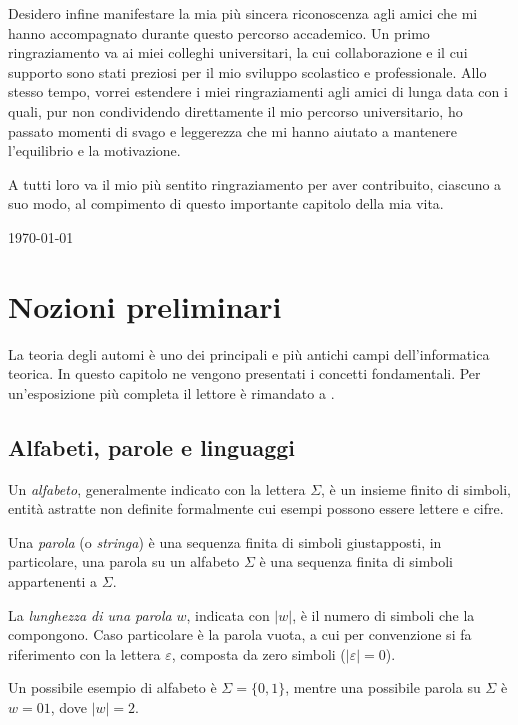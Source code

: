 \documentclass[a4paper,12pt]{report} %
\begin{document}
Desidero infine manifestare la mia più sincera riconoscenza agli amici che mi hanno accompagnato durante
questo percorso accademico. Un primo ringraziamento va ai miei colleghi universitari, la cui collaborazione
e il cui supporto sono stati preziosi per il mio sviluppo scolastico e professionale. 
Allo stesso tempo, vorrei estendere i miei ringraziamenti agli amici di lunga data con i quali,
pur non condividendo direttamente il mio percorso universitario, ho passato momenti di svago e leggerezza
che mi hanno aiutato a mantenere l'equilibrio e la motivazione.

A tutti loro va il mio più sentito ringraziamento per aver contribuito, ciascuno a suo modo, 
al compimento di questo importante capitolo della mia vita.

\hfill \today


\afterpreface


\chapter{Nozioni preliminari}
\label{cap1}

La teoria degli automi è uno dei principali e più antichi campi dell'informatica teorica. In questo capitolo
ne vengono presentati i concetti fondamentali. Per un'esposizione più completa il lettore è rimandato a \parencite{HMU06}.

\section{Alfabeti, parole e linguaggi}

Un \emph{alfabeto}, generalmente indicato con la lettera $\Sigma$, è un insieme finito di simboli,
entità astratte non definite formalmente cui esempi possono essere lettere e cifre.

Una \emph{parola} (o \emph{stringa}) è una sequenza finita di simboli giustapposti, in particolare, una parola su un alfabeto $\Sigma$
è una sequenza finita di simboli appartenenti a $\Sigma$.

La \emph{lunghezza di una parola} $w$, indicata con $|w|$, è il numero di simboli che la compongono.
Caso particolare è la parola vuota, a cui per convenzione si fa riferimento con la lettera $\varepsilon$,
composta da zero simboli ($|\varepsilon| = 0$).

Un possibile esempio di alfabeto è $\Sigma = \{0, 1\}$, mentre una possibile parola su $\Sigma$ è
$w = 01$, dove $|w| = 2$.
\end{document}
